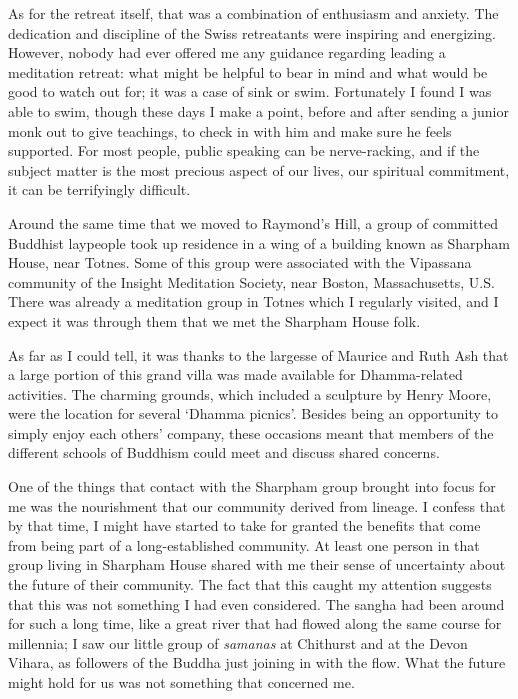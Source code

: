 As for the retreat itself, that was a combination of enthusiasm and
anxiety. The dedication and discipline of the Swiss retreatants were
inspiring and energizing. However, nobody had ever offered me any
guidance regarding leading a meditation retreat: what might be helpful
to bear in mind and what would be good to watch out for; it was a case
of sink or swim. Fortunately I found I was able to swim, though these
days I make a point, before and after sending a junior monk out to give
teachings, to check in with him and make sure he feels supported. For
most people, public speaking can be nerve-racking, and if the subject
matter is the most precious aspect of our lives, our spiritual
commitment, it can be terrifyingly difficult.

Around the same time that we moved to Raymond's Hill, a group of
committed Buddhist laypeople took up residence in a wing of a building
known as Sharpham House\cite{sharpham}, near Totnes.
Some of this group were associated with
the Vipassana community of the Insight Meditation Society, near Boston,
Massachusetts, U.S. There was already a meditation group in Totnes which
I regularly visited, and I expect it was through them that we met the
Sharpham House folk.

As far as I could tell, it was thanks to the largesse of Maurice and
Ruth Ash that a large portion of this grand villa was made available for
Dhamma-related activities. The charming grounds, which included a
sculpture by Henry Moore, were the location for several `Dhamma
picnics'. Besides being an opportunity to simply enjoy each others'
company, these occasions meant that members of the different schools of
Buddhism could meet and discuss shared concerns.

One of the things that contact with the Sharpham group brought into
focus for me was the nourishment that our community derived from
lineage. I confess that by that time, I might have started to take for
granted the benefits that come from being part of a long-established
community. At least one person in that group living in Sharpham House
shared with me their sense of uncertainty about the future of their
community. The fact that this caught my attention suggests that this was
not something I had even considered. The sangha had been around for such
a long time, like a great river that had flowed along the same course
for millennia; I saw our little group of \emph{samanas} at Chithurst and
at the Devon Vihara, as followers of the Buddha just joining in with the
flow. What the future might hold for us was not something that concerned
me.

